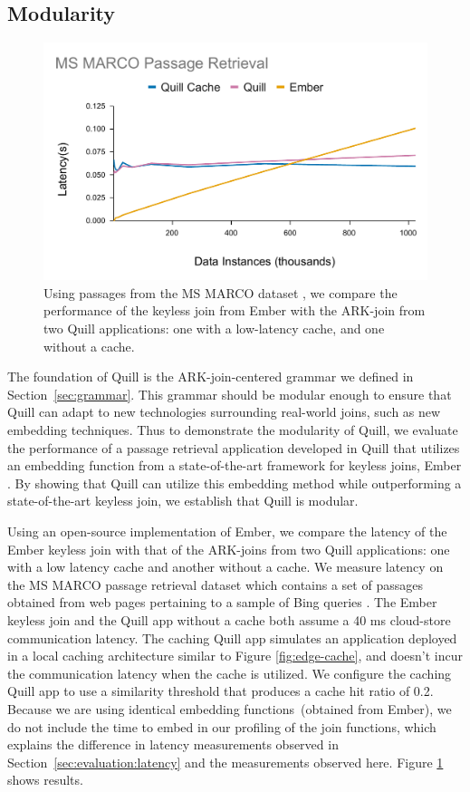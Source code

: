 \documentclass[11pt]{article}
\begin{document}
\subsection{Modularity}
\label{sec:evaluation:modularity}
\begin{figure}
  \centering
  \includegraphics[width=0.6\linewidth]{figs/msmarco_large.pdf}
  \caption{Using passages from the MS MARCO dataset \cite{msmarco}, we compare the performance of the keyless join from Ember \cite{suri2021ember} with the ARK-join from two Quill applications: one with a low-latency cache, and one without a cache. }
  \label{fig:msmarco}
\end{figure}

The foundation of Quill is the ARK-join-centered grammar we defined in Section~\ref{sec:grammar}.
This grammar should be modular enough to ensure that Quill can adapt to new technologies surrounding real-world joins, such as new embedding techniques.
Thus to demonstrate the modularity of Quill, we evaluate the performance of a passage retrieval application developed in Quill that utilizes an embedding function from a state-of-the-art framework for keyless joins, Ember \cite{suri2021ember}.
By showing that Quill can utilize this embedding method while outperforming a state-of-the-art keyless join, we establish that Quill is modular.

Using an open-source implementation of Ember, we compare the latency of the Ember keyless join with that of the ARK-joins from two Quill applications: one with a low latency cache and another without a cache.
We measure latency on the MS MARCO passage retrieval dataset which contains a set of passages obtained from web pages pertaining to a sample of Bing queries \cite{msmarco}.
The Ember keyless join and the Quill app without a cache both assume a 40 ms cloud-store communication latency.
The caching Quill app simulates an application deployed in a local caching architecture similar to Figure \ref{fig:edge-cache}, and doesn't incur the communication latency when the cache is utilized.
We configure the caching Quill app to use a similarity threshold that produces a cache hit ratio of 0.2.
Because we are using identical embedding functions~(obtained from Ember), we do not include the time to embed in our profiling of the join functions, which explains the difference in latency measurements observed in Section~\ref{sec:evaluation:latency} and the measurements observed here. Figure \ref{fig:msmarco} shows results.\vspace{0.1cm}
\end{document}
